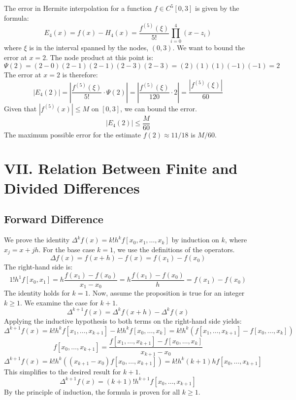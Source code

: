 \documentclass[a4paper]{article}
\begin{document}
The error in Hermite interpolation for a function $f \in C^5[0,3]$ is given by the formula:
\[
E_4(x) = f(x) - H_4(x) = \frac{f^{(5)}(\xi)}{5!} \prod_{i=0}^{4} (x-z_i)
\]
where $\xi$ is in the interval spanned by the nodes, $(0,3)$.
We want to bound the error at $x=2$. The node product at this point is:
\[
\Psi(2) = (2-0)(2-1)(2-1)(2-3)(2-3) = (2)(1)(1)(-1)(-1) = 2
\]
The error at $x=2$ is therefore:
\[
|E_4(2)| = \left| \frac{f^{(5)}(\xi)}{5!} \cdot \Psi(2) \right| = \left| \frac{f^{(5)}(\xi)}{120} \cdot 2 \right| = \frac{|f^{(5)}(\xi)|}{60}
\]
Given that $|f^{(5)}(x)| \le M$ on $[0,3]$, we can bound the error.
\[
|E_4(2)| \le \frac{M}{60}
\]
The maximum possible error for the estimate $f(2) \approx 11/18$ is $M/60$.




\section*{VII. Relation Between Finite and Divided Differences}

\subsection*{Forward Difference}

We prove the identity $\Delta^k f(x) = k!h^k f[x_0, x_1, \dots, x_k]$ by induction on $k$, where $x_j = x+jh$.
For the base case $k=1$, we use the definitions of the operators.
\[
\Delta f(x) = f(x+h) - f(x) = f(x_1) - f(x_0)
\]
The right-hand side is:
\[
1!h^1 f[x_0, x_1] = h \frac{f(x_1)-f(x_0)}{x_1 - x_0} = h \frac{f(x_1)-f(x_0)}{h} = f(x_1)-f(x_0)
\]
The identity holds for $k=1$.
Now, assume the proposition is true for an integer $k \ge 1$. We examine the case for $k+1$.
\[
\Delta^{k+1}f(x) = \Delta^k f(x+h) - \Delta^k f(x)
\]
Applying the inductive hypothesis to both terms on the right-hand side yields:
\[
\Delta^{k+1}f(x) = k!h^k f[x_1, \dots, x_{k+1}] - k!h^k f[x_0, \dots, x_k] = k!h^k \left( f[x_1, \dots, x_{k+1}] - f[x_0, \dots, x_k] \right)
\]
\[
f[x_0, \dots, x_{k+1}] = \frac{f[x_1, \dots, x_{k+1}] - f[x_0, \dots, x_k]}{x_{k+1}-x_0}
\]
\[
\Delta^{k+1}f(x) = k!h^k \left( (x_{k+1}-x_0) f[x_0, \dots, x_{k+1}] \right) = k!h^k (k+1)h f[x_0, \dots, x_{k+1}]
\]
This simplifies to the desired result for $k+1$.
\[
\Delta^{k+1}f(x) = (k+1)!h^{k+1}f[x_0, \dots, x_{k+1}]
\]
By the principle of induction, the formula is proven for all $k \ge 1$.
\end{document}
